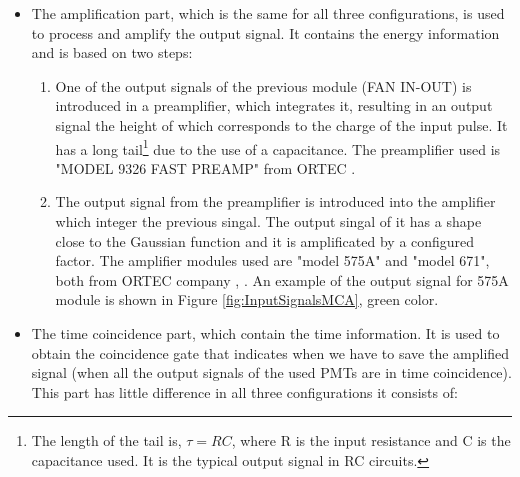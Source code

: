 \begin{itemize}

\item{} The amplification part, which is the same for all three configurations, is used to process and amplify the output signal. It contains the energy information and is based on two steps:



\begin{enumerate}

\item{} One of the output signals of the previous module (FAN IN-OUT) is introduced in a preamplifier, which integrates it, resulting in an output signal the height of which corresponds to the charge of the input pulse. It has a long tail\footnote{The length of the tail is, $\tau=RC$, where R is the input resistance and C is the capacitance used. It is the typical output signal in RC circuits.} due to the use of a capacitance. The preamplifier used is "MODEL 9326 FAST PREAMP" from ORTEC \cite{DataSheetPreAmp}.

\item{} The output signal from the preamplifier is introduced into the amplifier which integer the previous singal. The output singal of it has a shape close to the Gaussian function and it is amplificated by a configured factor. The amplifier modules used are "model 575A" and "model 671", both from ORTEC company \cite{DataSheet575Amp}, \cite{DataSheet671Amp}. An example of the output signal for 575A module is shown in Figure \ref{fig:InputSignalsMCA}, green color.

\end{enumerate}

\item{} The time coincidence part, which  contain the time information. It is used to obtain the coincidence gate that indicates when we have to save the amplified signal (when all the output signals of the used PMTs are in time coincidence). This part has little difference in all three configurations it consists of:

\begin{enumerate}


\end{enumerate}
\end{itemize}
